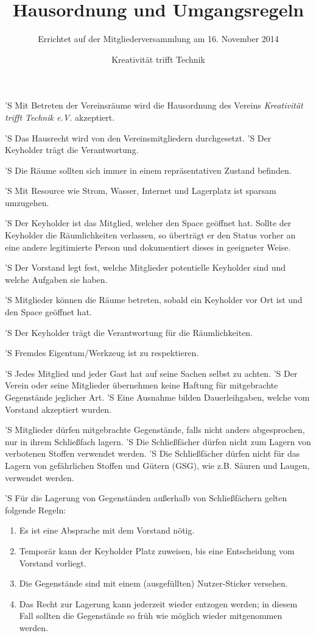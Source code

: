 \documentclass[a4paper,8pt]{scrreprt}
\begin{document}
\title{Hausordnung und Umgangsregeln}
\subtitle{Errichtet auf der Mitgliederversammlung am 16. November 2014}
\author{Kreativität trifft Technik}



\begin{contract}


'S Mit Betreten der Vereinsräume wird die Hausordnung des
Vereins \textit{Kreativität trifft Technik e.V.} akzeptiert.

'S Das Hausrecht wird von den Vereinsmitgliedern durchgesetzt.
'S Der Keyholder trägt die Verantwortung.

'S Die Räume sollten sich immer in einem repräsentativen Zustand befinden.

'S Mit Resource wie Strom, Wasser, Internet und Lagerplatz ist sparsam umzugehen.


'S Der Keyholder ist das Mitglied, welcher den Space geöffnet hat. Sollte der
Keyholder die Räumlichkeiten verlassen, so überträgt er den Status vorher an
eine andere legitimierte Person und dokumentiert dieses in geeigneter Weise.

'S Der Vorstand legt fest, welche Mitglieder potentielle Keyholder sind und
welche Aufgaben sie haben.

'S Mitglieder können die Räume betreten, sobald ein Keyholder vor Ort ist
und den Space geöffnet hat.

'S Der Keyholder trägt die Verantwortung für die Räumlichkeiten.


'S Fremdes Eigentum/Werkzeug ist zu respektieren.

'S Jedes Mitglied und jeder Gast hat auf seine Sachen selbst zu achten.
'S Der Verein oder seine Mitglieder übernehmen keine Haftung für mitgebrachte
Gegenstände jeglicher Art.
'S Eine Ausnahme bilden Dauerleihgaben, welche vom Vorstand akzeptiert wurden.

'S Mitglieder dürfen mitgebrachte Gegenstände, falls nicht anders abgesprochen,
nur in ihrem Schließfach lagern.
'S Die Schließfächer dürfen nicht zum Lagern von verbotenen Stoffen verwendet
werden.
'S Die Schließfächer dürfen nicht für das Lagern von gefährlichen Stoffen und
Gütern (GSG), wie z.B. Säuren und Laugen, verwendet werden.

'S Für die Lagerung von Gegenständen außerhalb von Schließfächern gelten folgende
Regeln:
\begin{enumerate}
	\item Es ist eine Absprache mit dem Vorstand nötig.
	\item Temporär kann der Keyholder Platz zuweisen, bis eine Entscheidung
	vom Vorstand vorliegt.
	\item Die Gegenstände sind mit einem (ausgefüllten) Nutzer-Sticker versehen.
	\item Das Recht zur Lagerung kann jederzeit wieder entzogen werden; in diesem
	Fall sollten die Gegenstände so früh wie möglich wieder mitgenommen werden.
\end{enumerate}


\end{contract}
\end{document}
